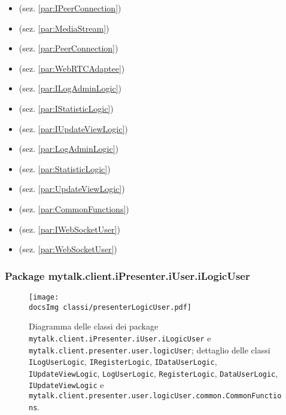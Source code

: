 {{\begin{itemize}
		\item[]  (sez. \ref{par:IPeerConnection})
		\item[]  (sez. \ref{par:MediaStream})
		\item[]  (sez. \ref{par:PeerConnection})
		\item[]  (sez. \ref{par:WebRTCAdaptee})
		\item[]  (sez. \ref{par:ILogAdminLogic})
		\item[]  (sez. \ref{par:IStatisticLogic})
		\item[]  (sez. \ref{par:IUpdateViewLogic})
		\item[]  (sez. \ref{par:LogAdminLogic})
		\item[]  (sez. \ref{par:StatisticLogic})
		\item[]  (sez. \ref{par:UpdateViewLogic})
		\item[]  (sez. \ref{par:CommonFunctions})
		\item[]  (sez. \ref{par:IWebSocketUser})
		\item[]  (sez. \ref{par:WebSocketUser})
	\end{itemize}

	\begin{sloppypar} {

	\subsubsection{Package mytalk.client.iPresenter.iUser.iLogicUser}{
	
\begin{figure}[h!tbp]
		\centering
		\label{fig:presenterLogicUser}
		\texttt{[image: \\docsImg classi/presenterLogicUser.pdf]}
\caption{Diagramma delle classi dei package \nolinkurl{mytalk.client.iPresenter.iUser.iLogicUser} e  \nolinkurl{mytalk.client.presenter.user.logicUser}; dettaglio delle classi \nolinkurl{ILogUserLogic}, \nolinkurl{IRegisterLogic}, \nolinkurl{IDataUserLogic}, \nolinkurl{IUpdateViewLogic}, \nolinkurl{LogUserLogic}, \nolinkurl{RegisterLogic}, \nolinkurl{DataUserLogic}, \nolinkurl{IUpdateViewLogic} e \nolinkurl{mytalk.client.presenter.user.logicUser.common.CommonFunctions}.}		
	\end{figure}
	
}}
\end{sloppypar}}}
